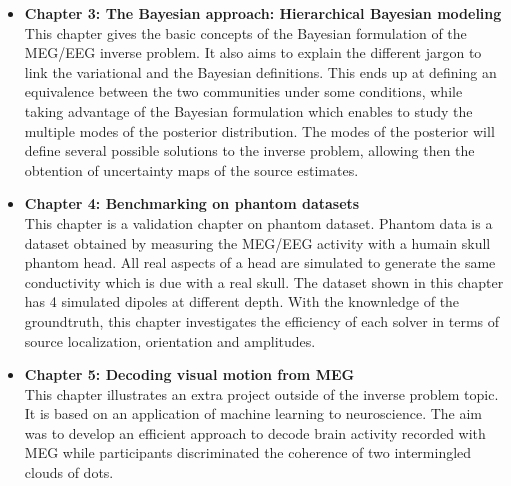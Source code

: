 \begin{itemize}
\item \textbf{Chapter 3: The Bayesian approach: Hierarchical Bayesian modeling}\\
This chapter gives the basic concepts of the Bayesian formulation of the MEG/EEG inverse problem. It also aims to explain the different jargon to link the variational and the Bayesian definitions. This ends up at defining an equivalence between the two communities under some conditions, while taking advantage of the Bayesian formulation which enables to study the multiple modes of the posterior distribution. The modes of the posterior will define several possible solutions to the inverse problem, allowing then the obtention of uncertainty maps of the source estimates. 

\item \textbf{Chapter 4: Benchmarking on phantom datasets}\\
This chapter is a validation chapter on phantom dataset. Phantom data is a dataset obtained by measuring the MEG/EEG activity with a humain skull phantom head. All real aspects of a head are simulated to generate the same conductivity which is due with a real skull. The dataset shown in this chapter has 4 simulated dipoles at different depth. With the knownledge of the groundtruth, this chapter investigates the efficiency of each solver in terms of source localization, orientation and amplitudes.

\item \textbf{Chapter 5: Decoding visual motion from MEG}\\
This chapter illustrates an extra project outside of the inverse problem topic. It is based on an application of machine learning to neuroscience. The aim was to develop an efficient approach to decode brain activity recorded with MEG while participants discriminated the coherence of two intermingled clouds of dots.
\end{itemize}

\newpage
